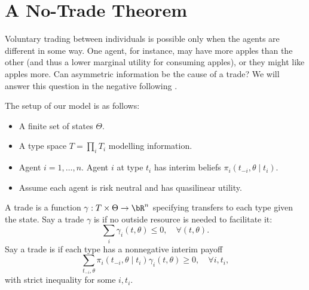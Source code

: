 \chapter{A No-Trade Theorem}

Voluntary trading between individuals is possible only when the agents are different in some way.
One agent, for instance, may have more apples than the other (and thus a lower marginal utility for consuming apples), or they might like apples more.
Can asymmetric information be the cause of a trade?
We will answer this question in the negative following \Textcite{morris1994TradeHeterogeneous}.

The setup of our model is as follows:
\begin{itemize}
  \item A finite set of states \(\Theta\).
  \item A type space \(T = \prod_i T_i\) modelling information.
  \item Agent \(i = 1, \dots, n\).
    Agent \(i\) at type \(t_i\) has interim beliefs \(\pi_i(t_{-i} , \theta \mid t_i)\).
  \item Assume each agent is risk neutral and has quasilinear utility.
\end{itemize}

A trade is a function \(\gamma: T \times \Theta \to \bR^n\) specifying transfers to each type given the state.
Say a trade \(\gamma\) is  if no outside resource is needed to facilitate it:
\[
  \sum_i \gamma_i(t, \theta) \leq 0, \quad \forall (t, \theta).
\]
Say a trade is  if each type has a nonnegative interim payoff
\[
  \sum_{t_{-i}, \theta} \pi_i(t_{-i}, \theta \mid t_i) \gamma_i(t, \theta) \geq 0, \quad \forall i, t_i,
\]
with strict inequality for some \(i, t_i\).

